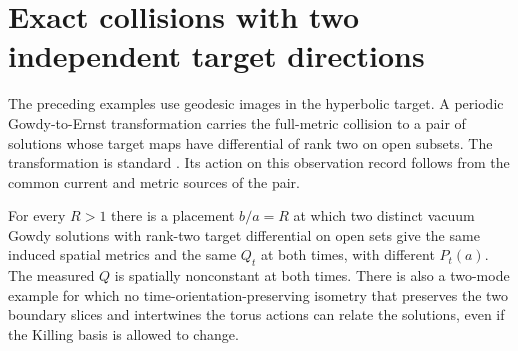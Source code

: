 \section{Exact collisions with two independent target directions}
\label{sec:rank-two}
The preceding examples use geodesic images in the hyperbolic
target. A periodic Gowdy-to-Ernst transformation carries the
full-metric collision to a pair of solutions whose target maps
have differential of rank two on open subsets.
The transformation is standard \cite[\S 2, Eq.~(7)]{rw}.
Its action on this observation record follows from the common
current and metric sources of the pair.

\begin{theorem}
\label{th:rank-two}
For every $R>1$ there is a placement $b/a=R$ at which two
distinct vacuum Gowdy solutions with rank-two target
differential on open sets give the same induced spatial
metrics and the same $Q_t$ at both times, with different
$P_t(a)$. The measured $Q$ is spatially nonconstant at both
times. There is also a two-mode example for which no
time-orientation-preserving isometry that preserves the two
boundary slices and intertwines the torus actions can relate
the solutions, even if the Killing basis is allowed to change.
\end{theorem}

